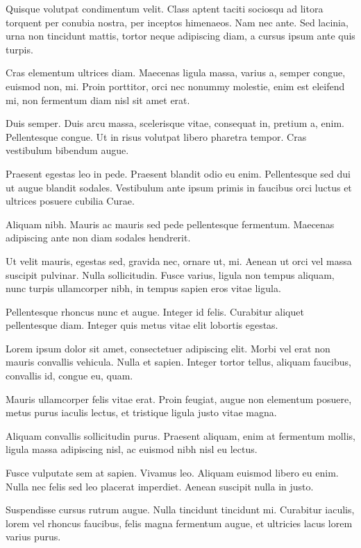 \documentclass[12pt,reqno,oneside]{amsbook}
\theoremstyle{definition}
\begin{document}
Quisque volutpat condimentum velit. Class aptent taciti sociosqu ad litora torquent per conubia nostra, per inceptos himenaeos. Nam nec ante. Sed lacinia, urna non tincidunt mattis, tortor neque adipiscing diam, a cursus ipsum ante quis turpis.

Cras elementum ultrices diam. Maecenas ligula massa, varius a, semper congue, euismod non, mi. Proin porttitor, orci nec nonummy molestie, enim est eleifend mi, non fermentum diam nisl sit amet erat.

Duis semper. Duis arcu massa, scelerisque vitae, consequat in, pretium a, enim. Pellentesque congue. Ut in risus volutpat libero pharetra tempor. Cras vestibulum bibendum augue.

Praesent egestas leo in pede. Praesent blandit odio eu enim. Pellentesque sed dui ut augue blandit sodales. Vestibulum ante ipsum primis in faucibus orci luctus et ultrices posuere cubilia Curae.

Aliquam nibh. Mauris ac mauris sed pede pellentesque fermentum. Maecenas adipiscing ante non diam sodales hendrerit.

Ut velit mauris, egestas sed, gravida nec, ornare ut, mi. Aenean ut orci vel massa suscipit pulvinar. Nulla sollicitudin. Fusce varius, ligula non tempus aliquam, nunc turpis ullamcorper nibh, in tempus sapien eros vitae ligula.

Pellentesque rhoncus nunc et augue. Integer id felis. Curabitur aliquet pellentesque diam. Integer quis metus vitae elit lobortis egestas.

Lorem ipsum dolor sit amet, consectetuer adipiscing elit. Morbi vel erat non mauris convallis vehicula. Nulla et sapien. Integer tortor tellus, aliquam faucibus, convallis id, congue eu, quam.

Mauris ullamcorper felis vitae erat. Proin feugiat, augue non elementum posuere, metus purus iaculis lectus, et tristique ligula justo vitae magna.

Aliquam convallis sollicitudin purus. Praesent aliquam, enim at fermentum mollis, ligula massa adipiscing nisl, ac euismod nibh nisl eu lectus.

Fusce vulputate sem at sapien. Vivamus leo. Aliquam euismod libero eu enim. Nulla nec felis sed leo placerat imperdiet. Aenean suscipit nulla in justo.

Suspendisse cursus rutrum augue. Nulla tincidunt tincidunt mi. Curabitur iaculis, lorem vel rhoncus faucibus, felis magna fermentum augue, et ultricies lacus lorem varius purus.
\end{document}
